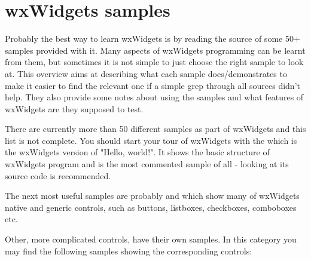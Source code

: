 
\section{wxWidgets samples}\label{samples}

Probably the best way to learn wxWidgets is by reading the source of some 50+
samples provided with it. Many aspects of wxWidgets programming can be learnt
from them, but sometimes it is not simple to just choose the right sample to
look at. This overview aims at describing what each sample does/demonstrates to
make it easier to find the relevant one if a simple grep through all sources
didn't help. They also provide some notes about using the samples and what
features of wxWidgets are they supposed to test.

There are currently more than 50 different samples as part of wxWidgets and
this list is not complete. You should start your tour of wxWidgets with the
 which is the wxWidgets version of
"Hello, world!". It shows the basic structure of wxWidgets program and is the
most commented sample of all - looking at its source code is recommended.

The next most useful samples are probably 
and  which show many of wxWidgets native and
generic controls, such as buttons, listboxes, checkboxes, comboboxes etc.

Other, more complicated controls, have their own samples. In this category you
may find the following samples showing the corresponding controls:

\begin{twocollist}\itemsep=0pt
\end{twocollist}

